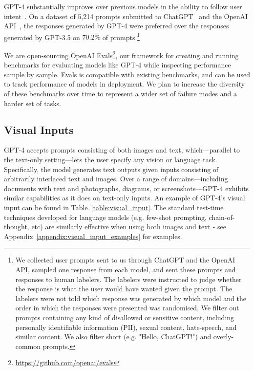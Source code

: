 \documentclass{article}
\begin{document}
GPT-4 substantially improves over previous models in the ability to follow user intent~\cite{ouyang2022training}. On a dataset of 5,214 prompts submitted to ChatGPT~\cite{openaichatgptblog} and the OpenAI API~\cite{openaiapiblog}, the responses generated by GPT-4 were preferred over the responses generated by GPT-3.5 on $70.2\%$ of prompts.\footnote{We collected user prompts sent to us through ChatGPT and the OpenAI API, sampled one response from each model, and sent these prompts and responses to human labelers. The labelers were instructed to judge whether the response is what the user would have wanted given the prompt. The labelers were not told which response was generated by which model and the order in which the responses were presented was randomised. We filter out prompts containing any kind of disallowed or sensitive content, including personally identifiable information (PII), sexual content, hate-speech, and similar content. We also filter short (e.g. "Hello, ChatGPT!") and overly-common prompts.}


We are open-sourcing OpenAI Evals\footnote{\href{https://github.com/openai/evals}{https://github.com/openai/evals}}, our framework for creating and running benchmarks for evaluating models like GPT-4 while inspecting performance sample by sample. Evals is compatible with existing benchmarks, and can be used to track performance of models in deployment. We plan to increase the diversity of these benchmarks over time to represent a wider set of failure modes and a harder set of tasks.


\subsection{Visual Inputs}




GPT-4 accepts prompts consisting of both images and text, which—parallel to the text-only setting—lets the user specify any vision or language task.
Specifically, the model generates text outputs given inputs consisting of arbitrarily
interlaced text and images.
Over a range of domains—including documents with text and photographs, diagrams, or screenshots—GPT-4 exhibits similar capabilities as it does on text-only inputs. An example of GPT-4's visual input can be found in Table~\ref{table:visual_input}. The standard test-time techniques developed for language models (e.g. few-shot prompting, chain-of-thought, etc) are similarly effective when using both images and text - see Appendix~\ref{appendix:visual_input_examples} for examples.
\end{document}
